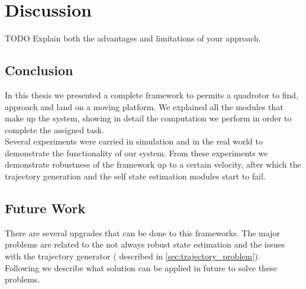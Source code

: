 \chapter{Discussion}\label{chap:discussion}

TODO
Explain both the advantages and limitations of your approach.

\section{Conclusion}\label{sec:conclusion}
In this thesis we presented a complete framework to permits a quadrotor to find, approach and land on a moving platform. We explained all the modules that make up the system, showing in detail the computation we perform in order to complete the assigned task. \\
Several experiments were carried in simulation and in the real world to demonstrate the functionality of our system. From these experiments we demonstrate robustness of the framework up to a certain velocity, after which the trajectory generation and the self state estimation modules start to fail.\\

\section{Future Work}\label{sec:future_work}
There are several upgrades that can be done to this frameworks. The major problems are related to the not always robust state estimation and the issues with the trajectory generator ( described in \ref{sec:trajectory_problem}).\\
 Following we describe what solution can be applied in future to solve these problems.

